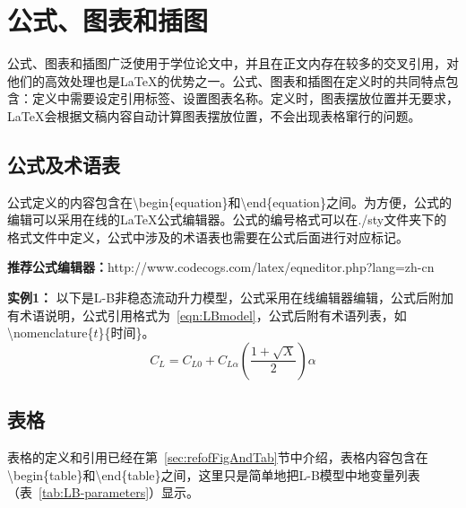 
\chapter{公式、图表和插图}
\label{chap:eqnFigAndTab}
公式、图表和插图广泛使用于学位论文中，并且在正文内存在较多的交叉引用，对他们的高效处理也是\LaTeX{}的优势之一。公式、图表和插图在定义时的共同特点包含：定义中需要设定引用标签、设置图表名称。定义时，图表摆放位置并无要求，\LaTeX{}会根据文稿内容自动计算图表摆放位置，不会出现表格窜行的问题。

\section{公式及术语表}
\label{sec:eqn}

公式定义的内容包含在\textbackslash begin\{equation\}和\textbackslash end\{equation\}之间。为方便，公式的编辑可以采用在线的\LaTeX{}公式编辑器。公式的编号格式可以在./sty文件夹下的格式文件中定义，公式中涉及的术语表也需要在公式后面进行对应标记。

{\bf{推荐公式编辑器：}}http://www.codecogs.com/latex/eqneditor.php?lang=zh-cn

{\bf{实例1：}} 以下是L-B非稳态流动升力模型，公式采用在线编辑器编辑，公式后附加有术语说明，公式引用格式为~\ref{eqn:LBmodel}，公式后附有术语列表，如\textbackslash nomenclature\{$t$\}\{时间\}。
\begin{equation}
 \label{eqn:LBmodel}
   C_{L}=C_{L0}+C_{L\alpha }\left ( \frac{1+\sqrt{X}}{2} \right )\alpha 
\end{equation}
%
%
%
%
%
%
%
%
%

\section{表格}
\label{sec:tab}
表格的定义和引用已经在第~\ref{sec:refofFigAndTab}节中介绍，表格内容包含在\textbackslash begin\{table\}和\textbackslash end\{table\}之间，这里只是简单地把L-B模型中地变量列表（表~\ref{tab:LB-parameters}）显示。

